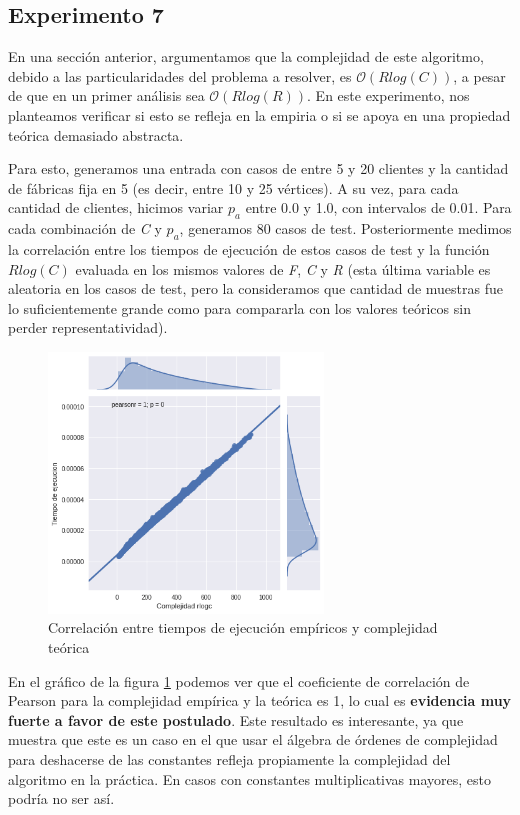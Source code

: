 \documentclass[a4paper]{report}
\begin{document}
\subsection{Experimento 7}

En una sección anterior, argumentamos que la complejidad de este algoritmo, debido a las particularidades del problema a resolver, es $\mathcal{O}(Rlog(C))$, a pesar de que en un primer análisis sea $\mathcal{O}(Rlog(R))$. En este experimento, nos planteamos verificar si esto se refleja en la empiria o si se apoya en una propiedad teórica demasiado abstracta.

Para esto, generamos una entrada con casos de entre 5 y 20 clientes y la cantidad de fábricas fija en 5 (es decir, entre 10 y 25 vértices). A su vez, para cada cantidad de clientes, hicimos variar $p_a$ entre 0.0 y 1.0, con intervalos de 0.01. Para cada combinación de \textit{C} y $p_{a}$, generamos 80 casos de test. Posteriormente medimos la correlación entre los tiempos de ejecución de estos casos de test y la función $Rlog(C)$ evaluada en los mismos valores de \textit{F}, \textit{C} y \textit{R} (esta última variable es aleatoria en los casos de test, pero la consideramos que cantidad de muestras fue lo suficientemente grande como para compararla con los valores teóricos sin perder representatividad).

\begin{figure}[!h]
    \centering
    \includegraphics[width=0.65\textwidth]{pearsonRlogc.png}
    \caption{Correlación entre tiempos de ejecución empíricos y complejidad teórica}
    \label{fig:pearsonrlogc}
\end{figure}

En el gráfico de la figura \ref{fig:pearsonrlogc} podemos ver que el coeficiente de correlación de Pearson para la complejidad empírica y la teórica es 1, lo cual es \textbf{evidencia muy fuerte a favor de este postulado}. Este resultado es interesante, ya que muestra que este es un caso en el que usar el álgebra de órdenes de complejidad para deshacerse de las constantes refleja propiamente la complejidad del algoritmo en la práctica. En casos con constantes multiplicativas mayores, esto podría no ser así.
\end{document}
